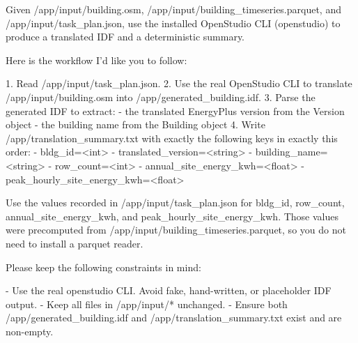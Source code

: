 \begin{instructionbox}
Given \textasciigrave{}/app/input/building.osm\textasciigrave{}, \textasciigrave{}/app/input/building\_timeseries.parquet\textasciigrave{}, and \textasciigrave{}/app/input/task\_plan.json\textasciigrave{}, use the installed OpenStudio CLI (\textasciigrave{}openstudio\textasciigrave{}) to produce a translated IDF and a deterministic summary.

Here is the workflow I'd like you to follow:

1. Read \textasciigrave{}/app/input/task\_plan.json\textasciigrave{}.
2. Use the real OpenStudio CLI to translate \textasciigrave{}/app/input/building.osm\textasciigrave{} into \textasciigrave{}/app/generated\_building.idf\textasciigrave{}.
3. Parse the generated IDF to extract:
   - the translated EnergyPlus version from the \textasciigrave{}Version\textasciigrave{} object
   - the building name from the \textasciigrave{}Building\textasciigrave{} object
4. Write \textasciigrave{}/app/translation\_summary.txt\textasciigrave{} with exactly the following keys in exactly this order:
   - \textasciigrave{}bldg\_id=\textless{}int\textgreater{}\textasciigrave{}
   - \textasciigrave{}translated\_version=\textless{}string\textgreater{}\textasciigrave{}
   - \textasciigrave{}building\_name=\textless{}string\textgreater{}\textasciigrave{}
   - \textasciigrave{}row\_count=\textless{}int\textgreater{}\textasciigrave{}
   - \textasciigrave{}annual\_site\_energy\_kwh=\textless{}float\textgreater{}\textasciigrave{}
   - \textasciigrave{}peak\_hourly\_site\_energy\_kwh=\textless{}float\textgreater{}\textasciigrave{}

Use the values recorded in \textasciigrave{}/app/input/task\_plan.json\textasciigrave{} for \textasciigrave{}bldg\_id\textasciigrave{}, \textasciigrave{}row\_count\textasciigrave{}, \textasciigrave{}annual\_site\_energy\_kwh\textasciigrave{}, and \textasciigrave{}peak\_hourly\_site\_energy\_kwh\textasciigrave{}. Those values were precomputed from \textasciigrave{}/app/input/building\_timeseries.parquet\textasciigrave{}, so you do not need to install a parquet reader.

Please keep the following constraints in mind:

- Use the real \textasciigrave{}openstudio\textasciigrave{} CLI. Avoid fake, hand-written, or placeholder IDF output.
- Keep all files in \textasciigrave{}/app/input/*\textasciigrave{} unchanged.
- Ensure both \textasciigrave{}/app/generated\_building.idf\textasciigrave{} and \textasciigrave{}/app/translation\_summary.txt\textasciigrave{} exist and are non-empty.
\end{instructionbox}

